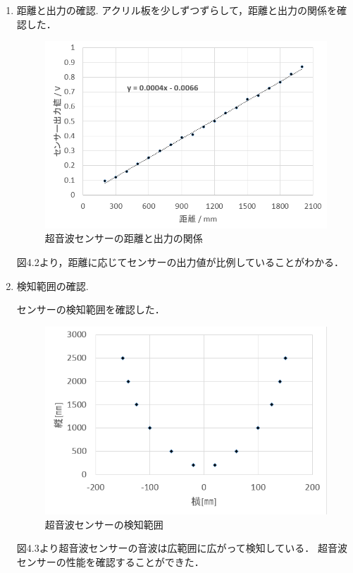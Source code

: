 \begin{enumerate}
  \item 距離と出力の確認.
アクリル板を少しずつずらして，距離と出力の関係を確認した．

\begin{figure}[htbp]
  \begin{center}
   \includegraphics[width=150mm]{img/距離と出力.jpg}
    \end{center}
  \caption{超音波センサーの距離と出力の関係}
 \label{fig:ensyu3tex}
\end{figure}

図4.2より，距離に応じてセンサーの出力値が比例していることがわかる．

  \item 検知範囲の確認.

センサーの検知範囲を確認した．

\begin{figure}[htbp]
  \begin{center}
   \includegraphics[width=150mm]{img/検知範囲.png}
    \end{center}
  \caption{超音波センサーの検知範囲}
 \label{fig:ensyu3tex}
\end{figure}

図4.3より超音波センサーの音波は広範囲に広がって検知している．
超音波センサーの性能を確認することができた．
\end{enumerate}




